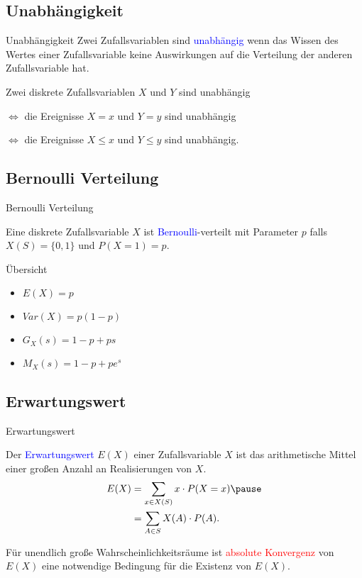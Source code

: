 \documentclass{beamer}
\def\padding{\vspace{0.5cm}}
\def\b{\textcolor{blue}}
\def\r{\textcolor{red}}
\begin{document}
\subsection{Unabhängigkeit}
\begin{frame}{Unabhängigkeit}
    Zwei Zufallsvariablen sind \b{unabhängig} wenn das Wissen des Wertes einer Zufallsvariable keine Auswirkungen auf die Verteilung der anderen Zufallsvariable hat.\pause\par\padding
    Zwei diskrete Zufallsvariablen $X$ und $Y$ sind unabhängig\par
    $\iff$ die Ereignisse $X=x$ und $Y=y$ sind unabhängig\pause\par
    $\iff$ die Ereignisse $X \leq x$ und $Y \leq y$ sind unabhängig.
\end{frame}

\subsection{Bernoulli Verteilung}
\begin{frame}{Bernoulli Verteilung}
    \begin{definition}
        Eine diskrete Zufallsvariable $X$ ist \b{Bernoulli}-verteilt mit Parameter $p$ falls $X(S) = \{0,1\}$ und $P(X=1) = p$.
    \end{definition}\pause
    \begin{exampleblock}{Übersicht}
        \begin{itemize}
            \item $E(X) = p$
            \item $Var(X) = p (1 - p)$
            \item $G_X(s) = 1 - p + p s$
            \item $M_X(s) = 1 - p + p e^s$
        \end{itemize}
    \end{exampleblock}
\end{frame}

\subsection{Erwartungswert}
\begin{frame}{Erwartungswert}
    \begin{definition}
        Der \b{Erwartungswert} $E(X)$ einer Zufallsvariable $X$ ist das arithmetische Mittel einer großen Anzahl an Realisierungen von $X$.\pause
        \begin{align*}
            E(X) &= \sum_{x \in X(S)} x \cdot P(X = x)\pause \\
                 &= \sum_{A \in S} X(A) \cdot P(A).
        \end{align*}
    \end{definition}\pause\par\padding
    Für unendlich große Wahrscheinlichkeitsräume ist \r{absolute Konvergenz} von $E(X)$ eine notwendige Bedingung für die Existenz von $E(X)$.
\end{frame}
\end{document}
